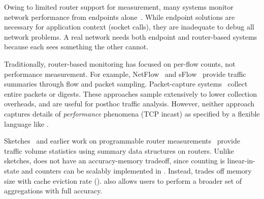 
 Owing to limited router support for
measurement, many systems monitor network performance from endpoints
alone~\cite{netpoirot, minlan-snap, dapper-sosr, trumpet, azure-smartnic}.
While endpoint solutions are necessary for application context (\eg socket
calls), they are inadequate to debug all network problems. A real network needs
both endpoint and router-based systems because each sees something the other
cannot.

 Traditionally, router-based monitoring has
focused on per-flow counts, not performance measurement. For example,
NetFlow~\cite{netflow} and sFlow~\cite{sflow} provide traffic summaries
through flow and packet sampling. Packet-capture systems~\cite{cisco-span,
niksun, netsight, everflow, pathdump, path_query} collect entire packets or
digests. These approaches sample extensively to lower collection
overheads, and are useful for posthoc traffic analysis. However, neither
approach captures details of {\em performance} phenomena (\eg TCP incast) as
specified by a flexible language like \TheSystem.

 Sketches~\cite{univmon, flowradar, counterbraids, dream} and
earlier work on programmable router measurements~\cite{progme, opensketch}
provide traffic volume statistics using summary data structures on routers.
Unlike sketches, \TheSystem does not have an accuracy-memory tradeoff, since
counting is linear-in-state and counters can be scalably implemented in \TheSystem. Instead,
\TheSystem trades off memory size with cache eviction rate ().
\TheSystem also allows users to perform a broader set of aggregations with full
accuracy.

